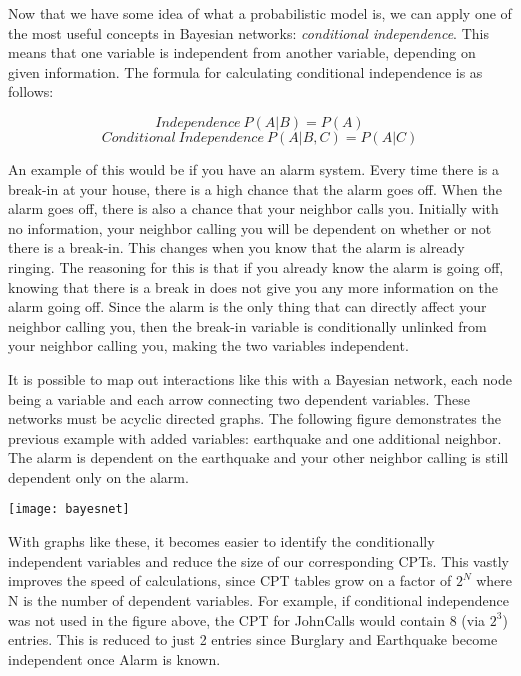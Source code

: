 Now that we have some idea of what a probabilistic model is, we can apply one of the most useful concepts in Bayesian networks: \textit{conditional independence}. This means that one variable is independent from another variable, depending on given information. The formula for calculating conditional independence is as follows:\par

\vspace{-32pt}
\begin{center}
  \begin{equation}
    Independence\:P(A|B)=P(A)
  \end{equation}
  \begin{equation}
    Conditional\:Independence \:P(A|B,C) = P(A|C)
  \end{equation}
\end{center}

An example of this would be if you have an alarm system. Every time there is a break-in at your house, there is a high chance that the alarm goes off. When the alarm goes off, there is also a chance that your neighbor calls you. Initially with no information, your neighbor calling you will be dependent on whether or not there is a break-in. This changes when you know that the alarm is already ringing. The reasoning for this is that if you already know the alarm is going off, knowing that there is a break in does not give you any more information on the alarm going off. Since the alarm is the only thing that can directly affect your neighbor calling you, then the break-in variable is conditionally unlinked from your neighbor calling you, making the two variables independent.\par
It is possible to map out interactions like this with a Bayesian network, each node being a variable and each arrow connecting two dependent variables. These networks must be acyclic directed graphs. The following figure demonstrates the previous example with added variables: earthquake and one additional neighbor. The alarm is dependent on the earthquake and your other neighbor calling is still dependent only on the alarm.\par

\begin{center}
  \texttt{[image: bayesnet]}
\end{center}

With graphs like these, it becomes easier to identify the conditionally independent variables and reduce the size of our corresponding CPT\textquotesingle s. This vastly improves the speed of calculations, since CPT tables grow on a factor of $2^N$ where N is the number of dependent variables. For example, if conditional independence was not used in the figure above, the CPT for JohnCalls would contain 8 (via $2^3$) entries. This is reduced to just 2 entries since Burglary and Earthquake become independent once Alarm is known.
